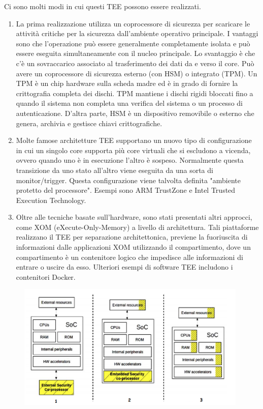 Ci sono molti modi in cui questi TEE possono essere realizzati.
\begin{enumerate}
    \item La prima realizzazione utilizza un coprocessore di sicurezza per scaricare le
attività critiche per la sicurezza dall'ambiente operativo principale. I vantaggi sono che l'operazione può essere generalmente
completamente isolata e può essere eseguita simultaneamente con il
nucleo principale. Lo svantaggio è che c'è un sovraccarico associato al trasferimento dei dati
da e verso il core.
Può avere un coprocessore di sicurezza esterno (con HSM) o integrato (TPM). Un TPM è un chip hardware sulla scheda madre ed è in grado di fornire la crittografia completa dei dischi. TPM mantiene i dischi rigidi bloccati fino a quando il sistema non completa una verifica del sistema o un processo di autenticazione. D'altra parte, HSM è un dispositivo removibile o esterno che genera, archivia e gestisce chiavi crittografiche.
    \item Molte famose architetture TEE supportano un nuovo tipo di configurazione in
cui un singolo core supporta più core virtuali che si escludono a vicenda,
ovvero quando uno è in esecuzione l'altro è sospeso. Normalmente questa
transizione da uno stato all'altro viene eseguita da una sorta di monitor/trigger. Questa configurazione viene talvolta definita "ambiente protetto del
processore".
Esempi sono ARM TrustZone e Intel Trusted Execution Technology.
    \item Oltre alle tecniche basate sull'hardware, sono stati presentati altri approcci,
come XOM (eXecute-Only-Memory) a livello di architettura. Tali piattaforme
realizzano il TEE per separazione architettonica, previene la fuoriuscita di
informazioni dalle applicazioni XOM utilizzando il compartimento, dove un
compartimento è un contenitore logico che impedisce alle informazioni di
entrare o uscire da esso.
Ulteriori esempi di software TEE includono i contenitori Docker.
\end{enumerate}

\begin{figure}[htb!]
    \centering
    \includegraphics[width=11cm]{./Images/cap6/6.6.png}
\end{figure}

